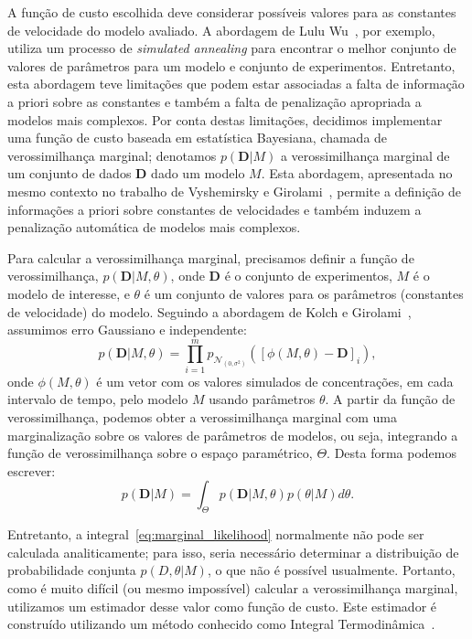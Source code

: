 \documentclass[12pt]{article}
\begin{document}
A função de custo escolhida deve considerar possíveis valores para as
constantes de velocidade do modelo avaliado. A abordagem de Lulu
Wu~\cite{Wu2015metodo}, por exemplo, utiliza um processo de {\em simulated
annealing} para encontrar o melhor conjunto de valores de parâmetros para
um modelo e conjunto de experimentos. Entretanto, esta abordagem teve
limitações que podem estar associadas a falta de informação a priori
sobre as constantes e também a falta de penalização apropriada a modelos
mais complexos. Por conta destas limitações, decidimos implementar uma
função de custo baseada em estatística Bayesiana, chamada de
verossimilhança marginal; denotamos $p (\mathbf{D} | M)$ a 
verossimilhança marginal de um conjunto de dados $\mathbf{D}$ dado um 
modelo $M$. Esta abordagem, apresentada no mesmo contexto no trabalho de 
Vyshemirsky e Girolami~\cite{Vyshemirsky2008}, permite a definição de 
informações a priori sobre constantes de velocidades e também induzem a 
penalização automática de modelos mais complexos.


Para calcular a verossimilhança marginal, precisamos definir a função de
verossimilhança, $p(\mathbf{D} | M, \theta)$, onde $\mathbf{D}$ é o 
conjunto de experimentos, $M$ é o modelo de interesse, e $\theta$ é um
conjunto de valores para os parâmetros (constantes de velocidade) do
modelo. Seguindo a abordagem de Kolch e Girolami~\cite{Xu2010}, assumimos erro
Gaussiano e independente:
\begin{equation}
    p (\mathbf{D} | M, \theta) = \prod_{i = 1}^m
    p_{\mathcal{N}_{\left(0, \sigma^2\right)}} ([\phi (M,\theta) -
    \mathbf{D}]_i),
\label{eq:likelihood}
\end{equation}
onde $\phi (M, \theta)$ é um vetor com os valores simulados de 
concentrações, em cada intervalo de tempo, pelo modelo $M$ usando 
parâmetros $\theta$. A partir da função de verossimilhança, podemos
obter a verossimilhança marginal com uma marginalização sobre os valores
de parâmetros de modelos, ou seja, integrando a função de 
verossimilhança sobre o espaço paramétrico, $\Theta$. Desta forma
podemos escrever:
\begin{equation}
    p (\mathbf{D} | M) = \int_{\Theta} p (\mathbf{D} | M, \theta) p
    (\theta | M)d\theta.
\label{eq:marginal_likelihood}
\end{equation}

Entretanto, a integral~\ref{eq:marginal_likelihood} normalmente não pode
ser calculada analiticamente; para isso, seria necessário determinar a distribuição de 
probabilidade conjunta $p(D, \theta | M)$, o que não é possível
usualmente. Portanto, como é muito difícil (ou mesmo impossível) calcular a
verossimilhança marginal, utilizamos um estimador desse valor como 
função de custo. Este estimador é construído utilizando um método
conhecido como Integral Termodinâmica~\cite{Friel2008}.
\end{document}
